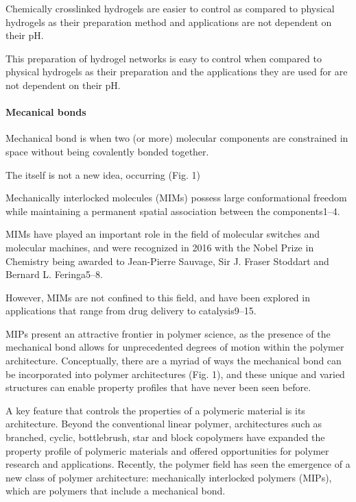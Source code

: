 Chemically crosslinked hydrogels are easier to control as compared to physical hydrogels as their preparation method and applications are not dependent on their pH.

This preparation of hydrogel networks is easy to control when compared to physical hydrogels as their preparation and the applications they are used for are not dependent on their pH. 

\paragraph{Mecanical bonds}\citep{hartMaterialPropertiesApplications2021}
Mechanical bond is when two (or more) molecular components are constrained in space without being covalently bonded together.

The  itself is not a new idea, occurring  (Fig. 1)

Mechanically interlocked molecules (MIMs) possess large conformational freedom while maintaining a permanent spatial association between the components1–4. 

MIMs have played an important role in the field of molecular switches and molecular machines, and were recognized in 2016 with the Nobel Prize in Chemistry being awarded to Jean-Pierre Sauvage, Sir J. Fraser Stoddart and Bernard L. Feringa5–8. 

However, MIMs are not confined to this field, and have been explored in applications that range from drug delivery to catalysis9–15.

MIPs present an attractive frontier in polymer science, as the presence of the mechanical bond allows for unprecedented degrees of motion within the polymer architecture. 
Conceptually, there are a myriad of ways the mechanical bond can be incorporated into polymer architectures (Fig. 1), and these unique and varied structures can enable property profiles that have never been seen before.



A key feature that controls the properties of a polymeric material is its architecture. 
Beyond the conventional linear polymer, architectures such as branched, cyclic, bottlebrush, star and block copolymers have expanded the property profile of polymeric materials and offered opportunities for polymer research and applications. 
Recently, the polymer field has seen the emergence of a new class of polymer architecture: mechanically interlocked polymers (MIPs), which are polymers that include a mechanical bond.


